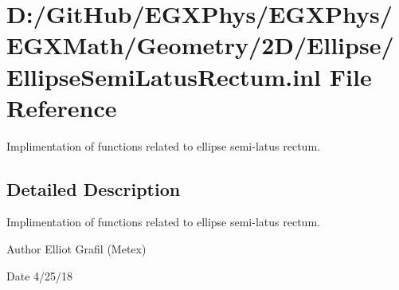 \hypertarget{_ellipse_semi_latus_rectum_8inl}{}\section{D\+:/\+Git\+Hub/\+E\+G\+X\+Phys/\+E\+G\+X\+Phys/\+E\+G\+X\+Math/\+Geometry/2\+D/\+Ellipse/\+Ellipse\+Semi\+Latus\+Rectum.inl File Reference}
\label{_ellipse_semi_latus_rectum_8inl}


Implimentation of functions related to ellipse semi-\/latus rectum.  




\subsection{Detailed Description}
Implimentation of functions related to ellipse semi-\/latus rectum. 

\begin{DoxyAuthor}{Author}
Elliot Grafil (Metex) 
\end{DoxyAuthor}
\begin{DoxyDate}{Date}
4/25/18 
\end{DoxyDate}
